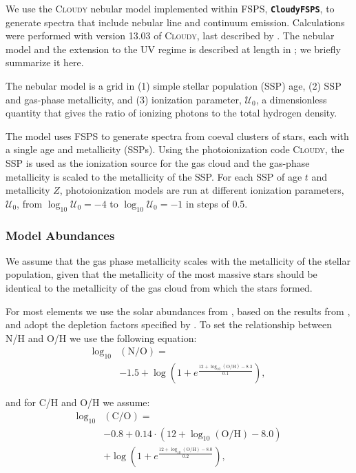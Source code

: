 \documentclass[preprint2]{aastex62}
\newcommand{\FSPS}{{\sc FSPS}\xspace}
\newcommand{\CloudyFSPS}{{\tt \textbf{CloudyFSPS}}\xspace}
\newcommand{\Cloudy}{\textsc{Cloudy}\xspace}
\newcommand{\logten}{\ensuremath{\log_{10}}}
\newcommand{\U}{\ensuremath{\mathcal{U}_{0}}\xspace}
\newcommand{\logUeq}[1]{\ensuremath{\logten \mathcal{U}_0 = #1}}
\begin{document}
We use the \Cloudy nebular model implemented within \FSPS, \CloudyFSPS \citep{cloudyFSPSv1}, to generate spectra that include nebular line and continuum emission. Calculations were performed with version 13.03 of \Cloudy, last described by \citet{Ferland+2013}. The nebular model and the extension to the UV regime is described at length in \citet{Byler+2018}; we briefly summarize it here.

The nebular model is a grid in (1) simple stellar population (SSP) age, (2) SSP and gas-phase metallicity, and (3) ionization parameter, \U, a dimensionless quantity that gives the ratio of ionizing photons to the total hydrogen density.

The model uses \FSPS to generate spectra from coeval clusters of stars, each with a single age and metallicity (SSPs). Using the photoionization code \Cloudy, the SSP is used as the ionization source for the gas cloud and the gas-phase metallicity is scaled to the metallicity of the SSP. For each SSP of age $t$ and metallicity $Z$, photoionization models are run at different ionization parameters, \U, from \logUeq{-4} to \logUeq{-1} in steps of 0.5.

\subsubsection{Model Abundances}\label{sec:model:neb:z}

We assume that the gas phase metallicity scales with the metallicity of the stellar population, given that the metallicity of the most massive stars should be identical to the metallicity of the gas cloud from which the stars formed.

For most elements we use the solar abundances from \citet{Grevesse+2010}, based on the results from \citet{Asplund+2009}, and adopt the depletion factors specified by \citet{Dopita+2013}. To set the relationship between N/H and O/H we use the following equation:
\begin{equation}\label{eq:nitrogen}
\begin{aligned}
    \log_{10}&(\mathrm{N}/\mathrm{O}) = \\
    & -1.5 + \log\left( 1 + e^{\frac{12 + \log_{10}(\mathrm{O}/\mathrm{H})-8.3}{0.1}}\right),
\end{aligned}
\end{equation}

and for C/H and O/H we assume:
\begin{equation}\label{eq:carbon}
\begin{aligned}
    \log_{10}&(\mathrm{C}/\mathrm{O}) = \\
    & -0.8 + 0.14\cdot\left(12 + \log_{10}(\mathrm{O}/\mathrm{H})-8.0\right) \\
    & + \log\left( 1 + e^{\frac{12 + \log_{10}(\mathrm{O}/\mathrm{H})-8.0}{0.2}}\right),
\end{aligned}
\end{equation}
\end{document}
